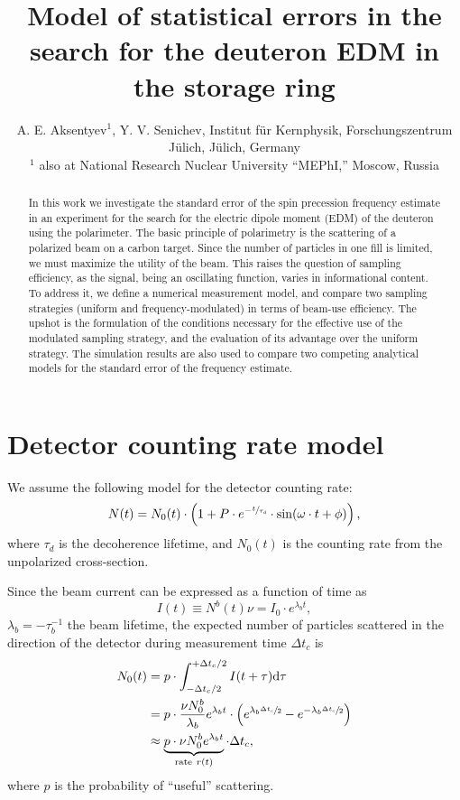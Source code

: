 \documentclass[a4paper]{jacow}
\newcommand{\td}{\mathrm{d}}
\newcommand{\cnt}{c}
\newcommand{\dt}{\Delta t}
\newcommand{\dtc}{\dt_{\cnt}}
\newcommand{\LTb}{\tau_b}
\newcommand{\LTd}{\tau_d}
\newcommand{\lamb}{\lambda_b}
\begin{document}
\title{Model of statistical errors in the search for the deuteron EDM in the storage ring}
\author{A. E. Aksentyev$^1$\footnotemark[2], Y. V. Senichev, Institut f\"ur Kernphysik, Forschungszentrum J\"ulich, J\"ulich, Germany \\$^1$ also at National Research Nuclear University ``MEPhI,'' Moscow, Russia}
\maketitle
{}

\begin{abstract}
In this work we investigate the standard error of the spin precession frequency estimate in an experiment for the search for the electric dipole moment (EDM) of the deuteron using the polarimeter. The basic principle of polarimetry is the scattering of a polarized beam on a carbon target. Since the number of particles in one fill is limited, we must maximize the utility of the beam. This raises the question of sampling efficiency, as the signal, being an oscillating function, varies in informational content. To address it, we define a numerical measurement model, and compare two sampling strategies (uniform and frequency-modulated) in terms of beam-use efficiency. The upshot is the formulation of the conditions necessary for the effective use of the modulated sampling strategy, and the evaluation of its advantage over the uniform strategy. The simulation results are also used to compare two competing analytical models for the standard error of the frequency estimate.
\end{abstract}

\section{Detector counting rate model}
We assume the following model for the detector counting rate:
\begin{equation}\label{eq:DetCntRt}
	N(t) = N_0(t)\cdot\bkt{1 + P\cdot e^{-\sfrac{t}{\LTd}}\cdot\sin(\omega\cdot t + \phi)},
\end{equation}
where $\LTd$ is the decoherence lifetime, and $N_0(t)$ is the counting rate from the unpolarized cross-section.

Since the beam current can be expressed as a function of time as 
\[
	I(t) \equiv N^b(t)\nu = I_0\cdot e^{\lamb t},
\]
$\lamb = -\LTb^{-1}$ the beam lifetime, the expected number of particles scattered in the direction of the detector during measurement time $\dtc$ is
\begin{align}
N_0(t) & = p\cdot\int_{-\dtc/2}^{+\dtc/2} I(t+\tau)\td\tau \notag                    \\
& = p\cdot\frac{\nu N_0^b}{\lamb} e^{\lamb t}\cdot \bkt{e^{\lamb\sfrac{\dtc}{2}} - e^{-\lamb\sfrac{\dtc}{2}}} \notag \\
& \approx \underbrace{p\cdot\nu N_0^b e^{\lamb t}}_{\text{rate}~r(t)} \cdot\dtc,
\end{align}
where $p$ is the probability of ``useful'' scattering.
\end{document}
